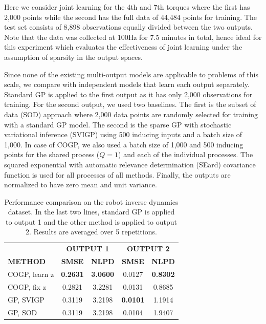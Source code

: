 Here we consider joint learning for the 4th and 7th torques where the first has 2,000 points  while the second has the full data of 44,484 points for training.
The test set consists of 8,898 observations equally divided between the two outputs.
Note that the data was collected at 100Hz for 7.5 minutes in total, hence ideal for this experiment which evaluates the effectiveness of joint learning under the assumption of sparsity in the output spaces.

Since none of the existing multi-output models are applicable to problems of this scale, we compare with independent models that learn each output separately.
Standard GP is applied to the first output as it has only 2,000 observations for training.
For the second output, we used two baselines.
The first is the subset of data (SOD) approach where 2,000 data points are randomly selected for training with a standard GP model.
The second is the sparse GP with stochastic variational inference (SVIGP) using 500 inducing inputs and a batch size of 1,000.
In case of COGP, we also used a batch size of 1,000 and 500 inducing points for the shared process ($Q = 1$) and each of the individual processes.
The squared exponential with automatic relevance determination (SEard) covariance function is used for all processes of all methods.
Finally, the outputs are normalized to have zero mean and unit variance. 

\begin{table}[t]
\caption{Performance comparison on the robot inverse dynamics dataset. In the last two lines, standard GP is applied to output 1 and the other method is applied to output 2. Results are averaged over 5 repetitions. }
\label{tab:robotarm}
\begin{center}
\begin{tabular}{lcccc}
\toprule
& \multicolumn{2}{c}{\textbf{OUTPUT 1}} & \multicolumn{2}{c}{\textbf{OUTPUT 2}} \\ \cmidrule(r){2-5}
\textbf{METHOD} & \textbf{SMSE} & \textbf{NLPD} & \textbf{SMSE} & \textbf{NLPD}\\ 
 \midrule
COGP, learn z & \textbf{0.2631} & \textbf{3.0600} & 0.0127 & \textbf{0.8302} \\
COGP, fix z & 0.2821& 3.2281 & 0.0131 & 0.8685 \\
GP, SVIGP & 0.3119 & 3.2198 & \textbf{0.0101} & 1.1914 \\
GP, SOD & 0.3119 & 3.2198 & 0.0104 & 1.9407 \\
\bottomrule
\end{tabular}
\end{center}
\end{table}

